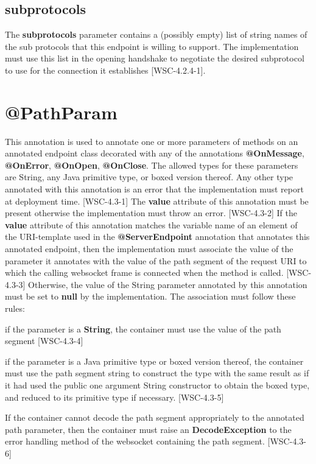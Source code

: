 \subsection{subprotocols}

The \textbf{subprotocols} parameter contains a (possibly empty) list of string names of the sub protocols that this endpoint is willing to support. The implementation must use this list in the opening handshake to negotiate the desired subprotocol to use for the connection it establishes [WSC-4.2.4-1].

\section{@PathParam}

This annotation is used to annotate one or more parameters of methods on an annotated endpoint class decorated with any of the annotations \textbf{@OnMessage}, \textbf{@OnError}, \textbf{@OnOpen}, \textbf{@OnClose}. The allowed types for these parameters are String, any Java primitive type, or boxed version thereof. Any other type annotated with this annotation is an error that the implementation must report at deployment time. [WSC-4.3-1]  The \textbf{value} attribute of this annotation must be present otherwise the implementation must throw an error. [WSC-4.3-2] If the \textbf{value} attribute of this annotation matches the variable name of an element of the URI-template used in the \textbf{@ServerEndpoint} annotation that annotates this annotated endpoint, then the implementation must associate the value of the parameter it annotates with the value of the path segment of the request URI to which the calling websocket frame is connected when the method is called. [WSC-4.3-3] Otherwise, the value of the String parameter annotated by this annotation must be set to \textbf{null} by the implementation. The association must follow these rules:

if the parameter is a \textbf{String}, the container must use the value of the path segment [WSC-4.3-4]

if the parameter is a Java primitive type or boxed version thereof, the container must use the path segment string to construct the type with the same result as if it had used the public one argument String constructor to obtain the boxed type, and reduced to its primitive type if necessary. [WSC-4.3-5]

If the container cannot decode the path segment appropriately to the annotated path parameter, then the container must raise an \textbf{DecodeException} to the error handling method of the websocket containing the path segment.  [WSC-4.3-6]

